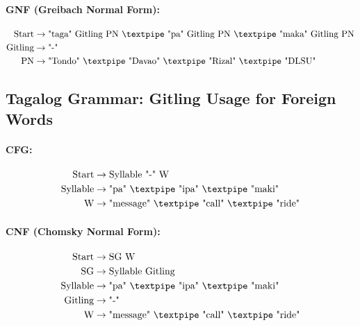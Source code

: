 \paragraph{GNF (Greibach Normal Form):}

\begin{equation*}
    \begin{aligned}
        \text{Start}   & \rightarrow \text{"taga" Gitling PN {\textpipe} "pa" Gitling PN {\textpipe} "maka" Gitling PN}\\
        \text{Gitling} & \rightarrow \text{"-"}\\
        \text{PN} & \rightarrow \text{"Tondo" {\textpipe} "Davao" {\textpipe} "Rizal" {\textpipe} "DLSU"}   \\
    \end{aligned}
\end{equation*}

\subsection{Tagalog Grammar: Gitling Usage for Foreign Words}

\paragraph{CFG:}

\begin{equation*}
    \begin{aligned}
        \text{Start}  & \rightarrow \text{Syllable "-" W}   \\
        \text{Syllable}    & \rightarrow \text{"pa" {\textpipe} "ipa" {\textpipe} "maki"}\\        
        \text{W} & \rightarrow \text{"message" {\textpipe} "call" {\textpipe} "ride"}   \\
    \end{aligned}
\end{equation*}

\paragraph{CNF (Chomsky Normal Form):}

\begin{equation*}
    \begin{aligned}
        \text{Start}   & \rightarrow \text{SG W} \\
        \text{SG}      & \rightarrow \text{Syllable Gitling}\\
        \text{Syllable}    & \rightarrow \text{"pa" {\textpipe} "ipa" {\textpipe} "maki"}\\        
        \text{Gitling} & \rightarrow \text{"-"}\\
        \text{W} & \rightarrow \text{"message" {\textpipe} "call" {\textpipe} "ride"}   \\
    \end{aligned}
\end{equation*}

